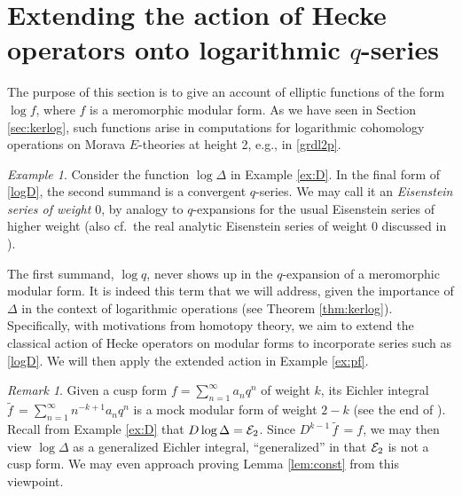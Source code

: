 \documentclass{gtpart}
\theoremstyle{definition}
\theoremstyle{remark}
\newtheorem{rmk}[equation]{Remark}
\newtheorem{ex}[equation]{Example}
\newcommand{\CE}{{\cal E}}
\renewcommand{\D}{\Delta}
\renewcommand{\=}{\approx}
\renewcommand{\-}{\sim}
\numberwithin{equation}{section}
\begin{document}
\section{Extending the action of Hecke operators onto logarithmic $q$-series}
\label{sec:logq}

The purpose of this section is to give an account of elliptic functions of the 
form $\log f$, where $f$ is a meromorphic modular form.  As we have seen in 
Section \ref{sec:kerlog}, such functions arise in computations for logarithmic 
cohomology operations on Morava $E$-theories at height 2, e.g., in 
\eqref{grdl2p}.  

\begin{ex}
 \label{ex:logD}
 Consider the function $\log \D$ in Example \ref{ex:D}.  In the final form of 
 \eqref{logD}, the second summand is a convergent $q$-series.  We may call it an 
 {\em Eisenstein series of weight $0$}, by analogy to $q$-expansions for the 
 usual Eisenstein series of higher weight (also cf.~the real analytic Eisenstein 
 series of weight 0 discussed in \cite[Sections 3.3 and 4.1]{Funke}).  

 The first summand, $\log q$, never shows up in the $q$-expansion of a 
 meromorphic modular form.  It is indeed this term that we will address, given 
 the importance of $\D$ in the context of logarithmic operations (see Theorem 
 \ref{thm:kerlog}).  Specifically, with motivations from homotopy theory, we aim 
 to extend the classical action of Hecke operators on modular forms to 
 incorporate series such as \eqref{logD}.  We will then apply the extended 
 action in Example \ref{ex:pf}.  
\end{ex}

\begin{rmk}
 \label{rmk:eichler}
 Given a cusp form $f = \sum_{n = 1}^\infty a_n q^n$ of weight $k$, its Eichler 
 integral $\widetilde{f\,} = \sum_{n = 1}^\infty n^{-k + 1} a_n q^n$ is a mock 
 modular form of weight $2 - k$ (see the end of \cite[\S 6]{mock}).  Recall from 
 Example \ref{ex:D} that $D \log \D = \CE_2$.  Since 
 $D^{k - 1} \, \widetilde{f\,} = f$, we may then view $\log \D$ as a generalized 
 Eichler integral, ``generalized'' in that $\CE_2$ is not a cusp form.  We may 
 even approach proving Lemma \ref{lem:const} from this viewpoint.  
\end{rmk}
\end{document}
